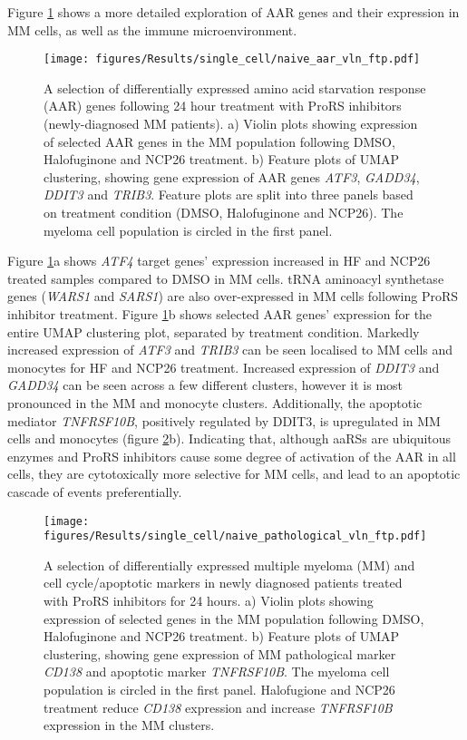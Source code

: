 Figure \ref{fig:naive_aar_vln_ftp} shows a more detailed exploration of AAR genes and their expression in MM cells, as well as the immune microenvironment.
%
\begin{figure}[htb]
\centering
\texttt{[image: figures/Results/single\_cell/naive\_aar\_vln\_ftp.pdf]}
\caption[scRNA-seq differentially expressed AAR genes- newly diagnosed patients]{A selection of differentially expressed amino acid starvation response (AAR) genes following 24 hour treatment with ProRS inhibitors (newly-diagnosed MM patients).
    a) Violin plots showing expression of selected AAR genes in the MM population following DMSO, Halofuginone and NCP26 treatment.
    b) Feature plots of UMAP clustering, showing gene expression of AAR genes \textit{ATF3}, \textit{GADD34}, \textit{DDIT3} and \textit{TRIB3}.
Feature plots are split into three panels based on treatment condition (DMSO, Halofuginone and NCP26).
The myeloma cell population is circled in the first panel.}
\label{fig:naive_aar_vln_ftp}
\end{figure}
Figure \ref{fig:naive_aar_vln_ftp}a shows \textit{ATF4} target genes' expression increased in HF and NCP26 treated samples compared to DMSO in MM cells.
tRNA aminoacyl synthetase genes (\textit{WARS1} and \textit{SARS1}) are also over-expressed in MM cells following ProRS inhibitor treatment.
Figure \ref{fig:naive_aar_vln_ftp}b shows selected AAR genes' expression for the entire UMAP clustering plot, separated by treatment condition.
Markedly increased expression of \textit{ATF3} and \textit{TRIB3} can be seen localised to MM cells and monocytes for HF and NCP26 treatment.
Increased expression of \textit{DDIT3} and \textit{GADD34} can be seen across a few different clusters, however it is most pronounced in the MM and monocyte clusters.
Additionally, the apoptotic mediator \textit{TNFRSF10B}, positively regulated by DDIT3, is upregulated in MM cells and monocytes (figure \ref{fig:naive_path_vln_ftp}b).
Indicating that, although aaRSs are ubiquitous enzymes and ProRS inhibitors cause some degree of activation of the AAR in all cells, they are cytotoxically more selective for MM cells, and lead to an apoptotic cascade of events preferentially.
%
\begin{figure}[htb]
\centering
\texttt{[image: figures/Results/single\_cell/naive\_pathological\_vln\_ftp.pdf]}
\caption[scRNA-seq differentially expressed MM markers- newly diagnosed patients]{A selection of differentially expressed multiple myeloma (MM) and cell cycle/apoptotic markers in newly diagnosed patients treated with ProRS inhibitors for 24 hours.
    a) Violin plots showing expression of selected genes in the MM population following DMSO, Halofuginone and NCP26 treatment.
    b) Feature plots of UMAP clustering, showing gene expression of MM pathological marker \textit{CD138} and apoptotic marker \textit{TNFRSF10B}.
The myeloma cell population is circled in the first panel.
Halofugione and NCP26 treatment reduce \textit{CD138} expression and increase \textit{TNFRSF10B} expression in the MM clusters.}
\label{fig:naive_path_vln_ftp}
\end{figure}
